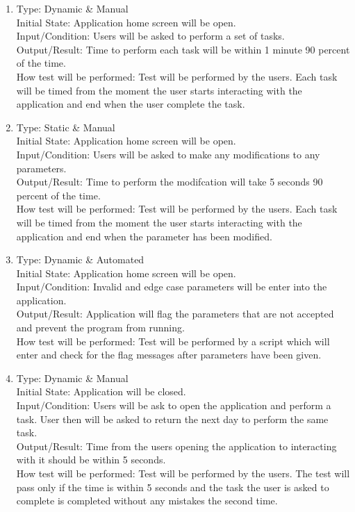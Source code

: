 \documentclass[12pt, titlepage]{article}
\begin{document}
\begin{adjustwidth}{2.2em}{0pt}
\begin{enumerate}[{NF-UT}1.]
    \item Type: Dynamic \& Manual\\
    Initial State: Application home screen will be open.\\
    Input/Condition: Users will be asked to perform a set of tasks.\\
    Output/Result: Time to perform each task will be within 1 minute 90 percent of the time.\\
    How test will be performed: Test will be performed by the users. Each task will be timed from the moment the user starts interacting with the application and end when the user complete the task.
    
    \item Type: Static \& Manual\\
    Initial State: Application home screen will be open.\\
    Input/Condition: Users will be asked to make any modifications to any parameters.\\
    Output/Result: Time to perform the modifcation will take 5 seconds 90 percent of the time.\\
    How test will be performed: Test will be performed by the users. Each task will be timed from the moment the user starts interacting with the application and end when the parameter has been modified.

    \item Type: Dynamic \& Automated\\
    Initial State: Application home screen will be open.\\
    Input/Condition: Invalid and edge case parameters will be enter into the application.\\
    Output/Result: Application will flag the parameters that are not accepted and prevent the program from running.\\
    How test will be performed: Test will be performed by a script which will enter and check for the flag messages after parameters have been given.

    \item Type: Dynamic \& Manual\\
    Initial State: Application will be closed.\\
    Input/Condition: Users will be ask to open the application and perform a task. User then will be asked to return the next day to perform the same task.\\
    Output/Result: Time from the users opening the application to interacting with it should be within 5 seconds.\\
    How test will be performed: Test will be performed by the users. The test will pass only if the time is within 5 seconds and the task the user is asked to complete is completed without any mistakes the second time.


\end{enumerate}
\end{adjustwidth}
\end{document}
